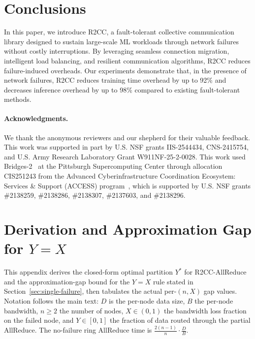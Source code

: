 \documentclass[letterpaper,twocolumn,10pt]{article}
\begin{document}



\section{Conclusions}

In this paper, we introduce R2CC, a fault-tolerant collective communication library designed to sustain large-scale ML workloads through network failures without costly interruptions. By leveraging seamless connection migration, intelligent load balancing, and resilient communication algorithms, R2CC reduces failure-induced overheads.
Our experiments demonstrate that, in the presence of network failures, R2CC reduces training time overhead by up to 92\% and decreases inference overhead by up to 98\% compared to existing fault-tolerant methods.

\paragraph{Acknowledgments.} We thank the anonymous reviewers and our shepherd for their valuable feedback.
This work was supported in part by U.S. NSF grants IIS-2544434, CNS-2415754, and U.S. Army Research Laboratory Grant W911NF-25-2-0028.
This work used Bridges-2~\cite{brown2021bridges} at the Pittsburgh Supercomputing Center through allocation CIS251243 from the Advanced Cyberinfrastructure Coordination Ecosystem: Services \& Support (ACCESS) program~\cite{boerner2023access}, which is supported by U.S. NSF grants \#2138259, \#2138286, \#2138307, \#2137603, and \#2138296.







\clearpage
\appendix
\section{Derivation and Approximation Gap for $Y = X$}\label{appendix:allreduce-math}

This appendix derives the closed-form optimal partition $Y^*$ for R2CC-AllReduce and the approximation-gap bound for the $Y = X$ rule stated in Section~\ref{sec:single-failure}, then tabulates the actual per-$(n, X)$ gap values. Notation follows the main text: $D$ is the per-node data size, $B$ the per-node bandwidth, $n \geq 2$ the number of nodes, $X \in (0, 1)$ the bandwidth loss fraction on the failed node, and $Y \in [0, 1]$ the fraction of data routed through the partial AllReduce. The no-failure ring AllReduce time is $\frac{2(n-1)}{n} \cdot \frac{D}{B}$.
\end{document}

